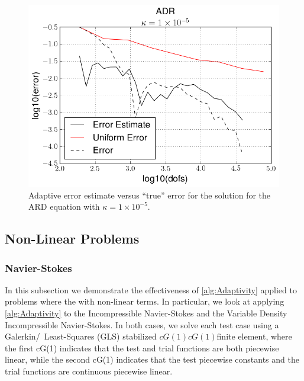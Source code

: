 \begin{test}[Convection Dominated ARD, $\kappa = 1\times10^{-5}$]
    \begin{figure}[h]
        \centering
        \includegraphics[scale=0.5]{Figures/AdaptiveADRkappa1E-5.png}
        \caption{Adaptive error estimate versus ``true'' error for the solution
            for the ARD equation with $\kappa=1\times 10^{-5}$.}
        \label{fig:ADRk1E-5_err}
    \end{figure}

\end{test}

\subsection{Non-Linear Problems}

\subsubsection{Navier-Stokes}

In this subsection we demonstrate the effectiveness of \autoref{alg:Adaptivity}
applied to problems where the with non-linear terms. In particular, we look at
applying \autoref{alg:Adaptivity} to the Incompressible Navier-Stokes and the
Variable Density Incompressible Navier-Stokes. In both cases, we solve each test
case using a Galerkin\slash~Least-Squares (GLS) stabilized $cG(1)cG(1)$finite
element, where the first cG(1) indicates that the test and trial functions are
both piecewise linear, while the second cG(1) indicates that the test piecewise
constants and the trial functions are continuous piecewise linear.

